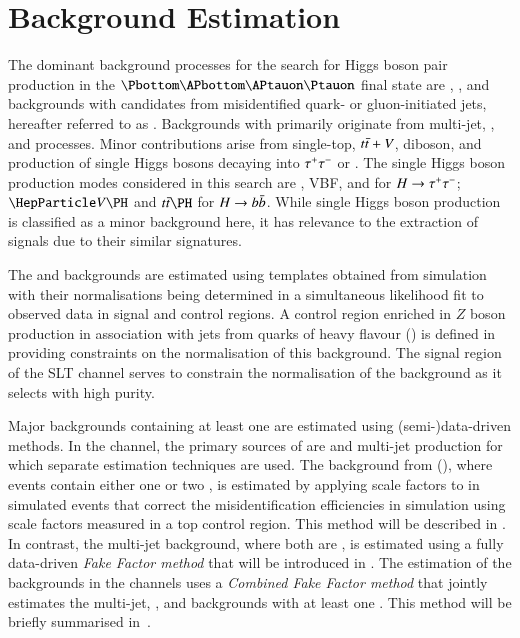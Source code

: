 \section{Background Estimation}
\label{sec:background_estimation}

The dominant background processes for the search for Higgs boson pair
production in the $\bbtautau$ final state are \ttbar, \Zjets, and
backgrounds with \tauhadvis candidates from misidentified quark- or
gluon-initiated jets, hereafter referred to as
\faketauhadvis. Backgrounds with \faketauhadvis primarily originate
from multi-jet, \Wjets, and \ttbar processes. Minor contributions
arise from single-top, $t\bar{t}+V$, diboson, and production of single
Higgs bosons decaying into $\tau^{+} \tau^{-}$ or \bbbar. The single Higgs boson
production modes considered in this search are \ggF, VBF, \VH and \ttH
for $H \to \tau^{+} \tau^{-}$; $\VH$ and $\ttH$ for $H \to b\bar{b}$. While single
Higgs boson production is classified as a minor background here, it
has relevance to the extraction of \HH signals due to their similar
signatures.

The \Zjets and \ttbar backgrounds are estimated using templates
obtained from simulation with their normalisations being determined in
a simultaneous likelihood fit to observed data in signal and control
regions. A control region enriched in $Z$ boson production in
association with jets from quarks of heavy flavour (\ZHF) is defined
in  providing constraints on the normalisation of
this background. The signal region of the \lephad SLT channel serves
to constrain the normalisation of the \ttbar background as it selects
\ttbar with high purity.

Major backgrounds containing at least one \faketauhad are estimated
using (semi-)data-driven methods. In the \hadhad channel, the primary
sources of \faketauhadvis are \ttbar and multi-jet production for
which separate estimation techniques are used. The \faketauhadvis
background from \ttbar (\ttbarFakes), where events contain either one
or two \faketauhadvis, is estimated by applying scale factors to
\faketauhadvis in simulated \ttbar events that correct the
\jettotauhadvis misidentification efficiencies in simulation using
scale factors measured in a top control region. This method will be
described in . In contrast, the
multi-jet background, where both \tauhadvis are \faketauhadvis, is
estimated using a fully data-driven \emph{Fake Factor method} that
will be introduced in .  The estimation of the
\faketauhadvis backgrounds in the \lephad channels uses a
\emph{Combined Fake Factor method} that jointly estimates the
multi-jet, \Wjets, and \ttbar backgrounds with at least one
\faketauhadvis. This method will be briefly summarised
in~.

